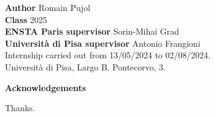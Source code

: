 \documentclass{amsart}
\begin{document}
\noindent\normalsize \textbf{Author} Romain Pujol  \\
\textbf{Class} 2025 \\

\noindent\textbf{ENSTA Paris supervisor} Sorin-Mihai Grad \\ 
\textbf{Università di Pisa supervisor} Antonio Frangioni \\

\noindent Internship carried out from 13/05/2024 to 02/08/2024. 
\\
Università di Pisa, Largo B. Pontecorvo, 3.


\newpage
\thispagestyle{empty}
\mbox{}
\newpage






\begin{titlepage}

    \vspace*{5cm}
        \Large\textbf{Acknowledgements}
    \vspace{1cm}
    
    \normalsize Thanks.
\end{titlepage}

\newpage
\end{document}
